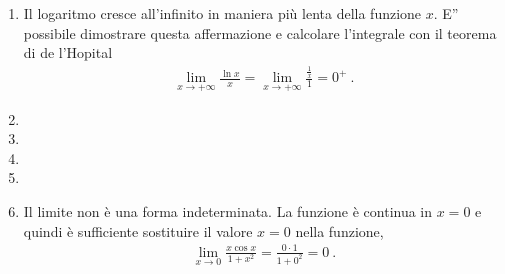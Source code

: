 \documentclass[letterpaper,10pt,italian]{jupyterBook}
\begin{document}
\begin{enumerate}
\sphinxAtStartPar
Sostituendo questa espansione al posto della radice nel limite,
\begin{equation*}
\begin{split}\lim_{x \to +\infty} x \left( \sqrt{1+ \frac{1}{x}} - 1 \right) = \lim_{x \to +\infty} x \left( 1 + \frac{1}{2}\frac{1}{x} + o\left(\frac{1}{x}\right) - 1 \right) = \frac{1}{2} \ .\end{split}
\end{equation*}
\sphinxAtStartPar
Oppure usando il teorema di de l’Hopital usando la variabile \(y = \frac{1}{x} \to 0^+\),
\begin{equation*}
\begin{split}\lim_{y \to 0^+} \dfrac{(1+y)^{\frac{1}{2}} - 1}{y} =(H)= \lim_{y \to 0^+} \frac{\frac{1}{2}(1+y)^{-\frac{1}{2}}}{1} = \frac{1}{2} \ .\end{split}
\end{equation*}
\item {} 
\sphinxAtStartPar
Il logaritmo cresce all’infinito in maniera più lenta della funzione \(x\). E” possibile dimostrare questa affermazione e calcolare l’integrale con il teorema di de l’Hopital
\begin{equation*}
\begin{split}\lim_{x \to +\infty} \frac{\ln x}{x} = \lim_{x \to +\infty} \frac{\frac{1}{x}}{1} = 0^+ \ .\end{split}
\end{equation*}
\item {} 
\item {} 
\item {} 
\item {} 
\item {} 
\sphinxAtStartPar
Il limite non è una forma indeterminata. La funzione è continua in \(x = 0\) e quindi è sufficiente sostituire il valore \(x=0\) nella funzione,
\begin{equation*}
\begin{split}\lim_{x \to 0} \frac{x \cos x}{1 + x^2} = \frac{0 \cdot 1}{1 + 0^2} = 0 \ .\end{split}
\end{equation*}
\end{enumerate}
 \label{exercise:ch/infinitesimal_calculus/analysis-problems-exercise-6}
\end{document}

